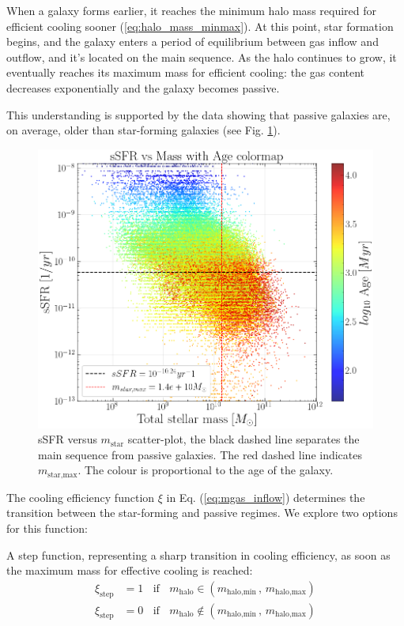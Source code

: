 \documentclass[fleqn,usenatbib]{mnras}
\begin{document}
When a galaxy forms earlier, it reaches the minimum halo mass required for efficient cooling sooner (\ref{eq:halo_mass_minmax}). At this point, star formation begins, and the galaxy enters a period of equilibrium between gas inflow and outflow, and it's located on the main sequence.
As the halo continues to grow, it eventually reaches its maximum mass for efficient cooling: the gas content decreases exponentially and the galaxy becomes passive.

This understanding is supported by the data showing that passive galaxies are, on average, older than star-forming galaxies (see Fig. \ref{fig:mass_sSFR_age}).

\begin{figure}\centering
	\includegraphics[width=0.86\columnwidth]{images/sSFR_Mass_AgeColormap.png}
    \caption{sSFR versus $m_\text{star}$ scatter-plot, the black dashed line separates the main sequence from passive galaxies. The red dashed line indicates $m_\text{star,max}$. The colour is proportional to the age of the galaxy.}
    \label{fig:mass_sSFR_age}
\end{figure}



The cooling efficiency function $\xi$ in Eq. (\ref{eq:mgas_inflow}) determines the transition between the star-forming and passive regimes. We explore two options for this function:

A step function, representing a sharp transition in cooling efficiency, as soon as the maximum mass for effective cooling is reached: 
\begin{align}
    \xi_\text{step} &= 1 \:\:\:\: \text{if} \:\:\:\: m_{\text{halo}} \in \left( m_{\text{halo,min}} \, , \, m_{\text{halo,max}} \right) \\
    \xi_\text{step} &= 0 \:\:\:\: \text{if} \:\:\:\:m_{\text{halo}} \notin \left( m_{\text{halo,min}} \, , \, m_{\text{halo,max}} \right)
    \label{eq:xi_step}
\end{align}
 
\end{document}
